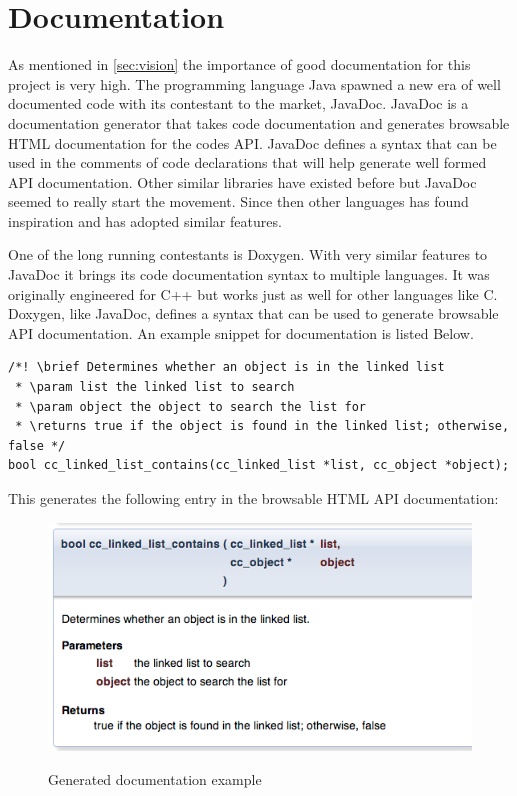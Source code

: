 \documentclass[table]{ituthesis}
\begin{document}
\section{Documentation}

As mentioned in \autoref{sec:vision} the importance of good documentation for this project is very high. The programming language Java spawned a new era of well documented code with its contestant to the market, JavaDoc. JavaDoc is a documentation generator that takes code documentation and generates browsable HTML documentation for the codes API. JavaDoc defines a syntax that can be used in the comments of code declarations that will help generate well formed API documentation. Other similar libraries have existed before but JavaDoc seemed to really start the movement. Since then other languages has found inspiration and has adopted similar features.

One of the long running contestants is Doxygen. With very similar features to JavaDoc it brings its code documentation syntax to multiple languages. It was originally engineered for C++ but works just as well for other languages like C. Doxygen, like JavaDoc, defines a syntax that can be used to generate browsable API documentation. An example snippet for documentation is listed Below.


\begin{lstlisting}[label=documentation-example,caption=Example of Doxygen comment]
/*! \brief Determines whether an object is in the linked list
 * \param list the linked list to search
 * \param object the object to search the list for
 * \returns true if the object is found in the linked list; otherwise, false */
bool cc_linked_list_contains(cc_linked_list *list, cc_object *object);
\end{lstlisting}


This generates the following entry in the browsable HTML API documentation:

	\begin{figure}[ht!]
		\begin{center}
			\includegraphics[scale=0.6]{images/doxygen_example.png}
			\label{fig:doxygen_example}
			\caption{Generated documentation example}
		\end{center}
	\end{figure}
	
\end{document}
